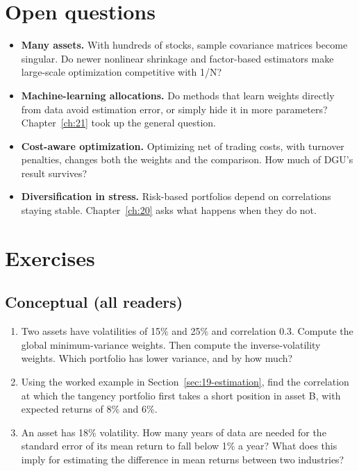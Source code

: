 \section{Open questions}
\label{sec:19-open}

\begin{itemize}
  \item \textbf{Many assets.} With hundreds of stocks, sample covariance matrices become singular. Do newer nonlinear shrinkage and factor-based estimators make large-scale optimization competitive with 1/N?
  \item \textbf{Machine-learning allocations.} Do methods that learn weights directly from data avoid estimation error, or simply hide it in more parameters? Chapter~\ref{ch:21} took up the general question.
  \item \textbf{Cost-aware optimization.} Optimizing net of trading costs, with turnover penalties, changes both the weights and the comparison. How much of DGU's result survives?
  \item \textbf{Diversification in stress.} Risk-based portfolios depend on correlations staying stable. Chapter~\ref{ch:20} asks what happens when they do not.
\end{itemize}

\section*{Exercises}

\subsection*{Conceptual (all readers)}

\begin{enumerate}
  \item Two assets have volatilities of 15\% and 25\% and correlation 0.3. Compute the global minimum-variance weights. Then compute the inverse-volatility weights. Which portfolio has lower variance, and by how much?
  \item Using the worked example in Section~\ref{sec:19-estimation}, find the correlation at which the tangency portfolio first takes a short position in asset B, with expected returns of 8\% and 6\%.
  \item An asset has 18\% volatility. How many years of data are needed for the standard error of its mean return to fall below 1\% a year? What does this imply for estimating the difference in mean returns between two industries?
\end{enumerate}

